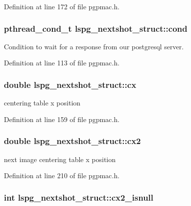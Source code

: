 Definition at line 172 of file pgpmac.h.\hypertarget{structlspg__nextshot__struct_afc773a9eefc173aa98d5c2889e1d7669}{
\subsubsection[{cond}]{\setlength{\rightskip}{0pt plus 5cm}pthread\_\-cond\_\-t {\bf lspg\_\-nextshot\_\-struct::cond}}}
\label{structlspg__nextshot__struct_afc773a9eefc173aa98d5c2889e1d7669}


Condition to wait for a response from our postgresql server. 

Definition at line 113 of file pgpmac.h.\hypertarget{structlspg__nextshot__struct_ad9eb2013fa6f295f72f0891fe98c863f}{
\subsubsection[{cx}]{\setlength{\rightskip}{0pt plus 5cm}double {\bf lspg\_\-nextshot\_\-struct::cx}}}
\label{structlspg__nextshot__struct_ad9eb2013fa6f295f72f0891fe98c863f}


centering table x position 

Definition at line 159 of file pgpmac.h.\hypertarget{structlspg__nextshot__struct_a10d45763100bc59f9a5f68f1b48db6d3}{
\subsubsection[{cx2}]{\setlength{\rightskip}{0pt plus 5cm}double {\bf lspg\_\-nextshot\_\-struct::cx2}}}
\label{structlspg__nextshot__struct_a10d45763100bc59f9a5f68f1b48db6d3}


next image centering table x position 

Definition at line 210 of file pgpmac.h.\hypertarget{structlspg__nextshot__struct_a3ad947f4efe2cb5c338244b019334749}{
\subsubsection[{cx2\_\-isnull}]{\setlength{\rightskip}{0pt plus 5cm}int {\bf lspg\_\-nextshot\_\-struct::cx2\_\-isnull}}}
\label{structlspg__nextshot__struct_a3ad947f4efe2cb5c338244b019334749}


